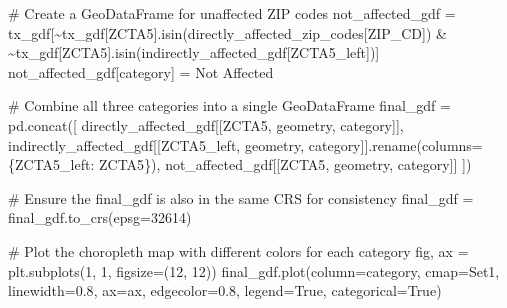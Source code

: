 \documentclass[
  letterpaper,
  DIV=11,
  numbers=noendperiod]{scrartcl}
\newenvironment{Shaded}{\begin{snugshade}}{\end{snugshade}}
\newcommand{\CommentTok}[1]{\textcolor[rgb]{0.37,0.37,0.37}{#1}}
\newcommand{\DecValTok}[1]{\textcolor[rgb]{0.68,0.00,0.00}{#1}}
\newcommand{\FloatTok}[1]{\textcolor[rgb]{0.68,0.00,0.00}{#1}}
\newcommand{\NormalTok}[1]{\textcolor[rgb]{0.00,0.23,0.31}{#1}}
\newcommand{\OperatorTok}[1]{\textcolor[rgb]{0.37,0.37,0.37}{#1}}
\newcommand{\StringTok}[1]{\textcolor[rgb]{0.13,0.47,0.30}{#1}}
\newcommand{\VariableTok}[1]{\textcolor[rgb]{0.07,0.07,0.07}{#1}}
\begin{document}
\begin{Shaded}
\begin{Highlighting}[]
\CommentTok{\# Create a GeoDataFrame for unaffected ZIP codes}
\NormalTok{not\_affected\_gdf }\OperatorTok{=}\NormalTok{ tx\_gdf[}\OperatorTok{\textasciitilde{}}\NormalTok{tx\_gdf[}\StringTok{\textquotesingle{}ZCTA5\textquotesingle{}}\NormalTok{].isin(directly\_affected\_zip\_codes[}\StringTok{\textquotesingle{}ZIP\_CD\textquotesingle{}}\NormalTok{]) }\OperatorTok{\&} 
                          \OperatorTok{\textasciitilde{}}\NormalTok{tx\_gdf[}\StringTok{\textquotesingle{}ZCTA5\textquotesingle{}}\NormalTok{].isin(indirectly\_affected\_gdf[}\StringTok{\textquotesingle{}ZCTA5\_left\textquotesingle{}}\NormalTok{])]}
\NormalTok{not\_affected\_gdf[}\StringTok{\textquotesingle{}category\textquotesingle{}}\NormalTok{] }\OperatorTok{=} \StringTok{\textquotesingle{}Not Affected\textquotesingle{}}

\CommentTok{\# Combine all three categories into a single GeoDataFrame}
\NormalTok{final\_gdf }\OperatorTok{=}\NormalTok{ pd.concat([}
\NormalTok{    directly\_affected\_gdf[[}\StringTok{\textquotesingle{}ZCTA5\textquotesingle{}}\NormalTok{, }\StringTok{\textquotesingle{}geometry\textquotesingle{}}\NormalTok{, }\StringTok{\textquotesingle{}category\textquotesingle{}}\NormalTok{]],}
\NormalTok{    indirectly\_affected\_gdf[[}\StringTok{\textquotesingle{}ZCTA5\_left\textquotesingle{}}\NormalTok{, }\StringTok{\textquotesingle{}geometry\textquotesingle{}}\NormalTok{, }\StringTok{\textquotesingle{}category\textquotesingle{}}\NormalTok{]].rename(columns}\OperatorTok{=}\NormalTok{\{}\StringTok{\textquotesingle{}ZCTA5\_left\textquotesingle{}}\NormalTok{: }\StringTok{\textquotesingle{}ZCTA5\textquotesingle{}}\NormalTok{\}),}
\NormalTok{    not\_affected\_gdf[[}\StringTok{\textquotesingle{}ZCTA5\textquotesingle{}}\NormalTok{, }\StringTok{\textquotesingle{}geometry\textquotesingle{}}\NormalTok{, }\StringTok{\textquotesingle{}category\textquotesingle{}}\NormalTok{]]}
\NormalTok{])}

\CommentTok{\# Ensure the final\_gdf is also in the same CRS for consistency}
\NormalTok{final\_gdf }\OperatorTok{=}\NormalTok{ final\_gdf.to\_crs(epsg}\OperatorTok{=}\DecValTok{32614}\NormalTok{)}

\CommentTok{\# Plot the choropleth map with different colors for each category}
\NormalTok{fig, ax }\OperatorTok{=}\NormalTok{ plt.subplots(}\DecValTok{1}\NormalTok{, }\DecValTok{1}\NormalTok{, figsize}\OperatorTok{=}\NormalTok{(}\DecValTok{12}\NormalTok{, }\DecValTok{12}\NormalTok{))}
\NormalTok{final\_gdf.plot(column}\OperatorTok{=}\StringTok{\textquotesingle{}category\textquotesingle{}}\NormalTok{, cmap}\OperatorTok{=}\StringTok{\textquotesingle{}Set1\textquotesingle{}}\NormalTok{, linewidth}\OperatorTok{=}\FloatTok{0.8}\NormalTok{, ax}\OperatorTok{=}\NormalTok{ax, edgecolor}\OperatorTok{=}\StringTok{\textquotesingle{}0.8\textquotesingle{}}\NormalTok{, legend}\OperatorTok{=}\VariableTok{True}\NormalTok{, categorical}\OperatorTok{=}\VariableTok{True}\NormalTok{)}


\end{Highlighting}
\end{Shaded}
\end{document}
